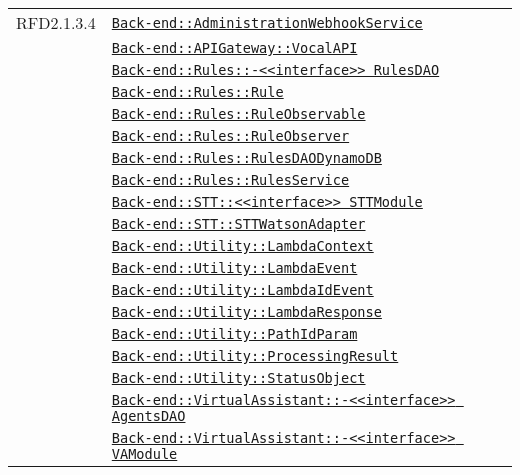 \begin{longtable}{|>{\centering}m{3cm}|m{10cm}<{\centering}|}
RFD2.1.3.4 & \hyperref[Back-end::AdministrationWebhookService]{\texttt{Back-end::AdministrationWebhookService}}\\
& \hyperref[Back-end::APIGateway::VocalAPI]{\texttt{Back-end::APIGateway::VocalAPI}}\\
& \hyperref[Back-end::Rules::<<interface>> RulesDAO]{\texttt{Back-end::Rules::-\linebreak <<interface>> RulesDAO}}\\
& \hyperref[Back-end::Rules::Rule]{\texttt{Back-end::Rules::Rule}}\\
& \hyperref[Back-end::Rules::RuleObservable]{\texttt{Back-end::Rules::RuleObservable}}\\
& \hyperref[Back-end::Rules::RuleObserver]{\texttt{Back-end::Rules::RuleObserver}}\\
& \hyperref[Back-end::Rules::RulesDAODynamoDB]{\texttt{Back-end::Rules::RulesDAODynamoDB}}\\
& \hyperref[Back-end::Rules::RulesService]{\texttt{Back-end::Rules::RulesService}}\\
& \hyperref[Back-end::STT::<<interface>> STTModule]{\texttt{Back-end::STT::<<interface>> STTModule}}\\
& \hyperref[Back-end::STT::STTWatsonAdapter]{\texttt{Back-end::STT::STTWatsonAdapter}}\\
& \hyperref[Back-end::Utility::LambdaContext]{\texttt{Back-end::Utility::LambdaContext}}\\
& \hyperref[Back-end::Utility::LambdaEvent]{\texttt{Back-end::Utility::LambdaEvent}}\\
& \hyperref[Back-end::Utility::LambdaIdEvent]{\texttt{Back-end::Utility::LambdaIdEvent}}\\
& \hyperref[Back-end::Utility::LambdaResponse]{\texttt{Back-end::Utility::LambdaResponse}}\\
& \hyperref[Back-end::Utility::PathIdParam]{\texttt{Back-end::Utility::PathIdParam}}\\
& \hyperref[Back-end::Utility::ProcessingResult]{\texttt{Back-end::Utility::ProcessingResult}}\\
& \hyperref[Back-end::Utility::StatusObject]{\texttt{Back-end::Utility::StatusObject}}\\
& \hyperref[Back-end::VirtualAssistant::<<interface>> AgentsDAO]{\texttt{Back-end::VirtualAssistant::-\linebreak <<interface>> AgentsDAO}}\\
& \hyperref[Back-end::VirtualAssistant::<<interface>> VAModule]{\texttt{Back-end::VirtualAssistant::-\linebreak <<interface>> VAModule}}\\

\end{longtable}
